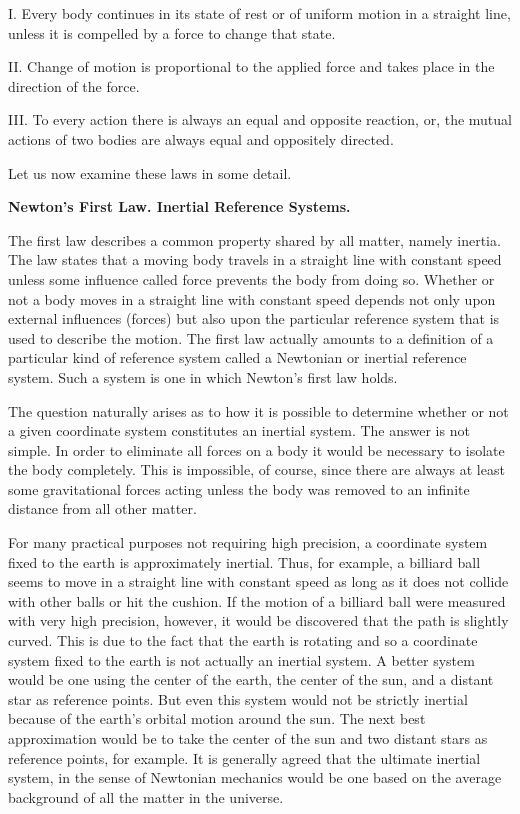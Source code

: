 \documentclass[a4paper]{article}
\begin{document}
I. Every body continues in its state of rest or of uniform motion in a straight line, unless it is compelled by a force to
change that state.

II. Change of motion is proportional to the applied force and takes place in the direction of the force.

III. To every action there is always an equal and opposite reaction, or, the mutual actions of two bodies are always equal
and oppositely directed.

Let us now examine these laws in some detail.

\textbf{Newton's First Law. Inertial Reference Systems.}

The first law describes a common property shared by all matter, namely inertia. The law states that a moving body travels
in a straight line with constant speed unless some influence called force prevents the body from doing so. Whether or not
a body moves in a straight line with constant speed depends not only upon external influences (forces) but also upon the
particular reference system that is used to describe the motion. The first law actually amounts to a definition of a
particular kind of reference system called a Newtonian or inertial reference system. Such a system is one in which Newton's
first law holds.

The question naturally arises as to how it is possible to determine whether or not a given coordinate system constitutes
an inertial system. The answer is not simple. In order to eliminate all forces on a body it would be necessary to isolate
the body completely. This is impossible, of course, since there are always at least some gravitational forces acting unless
the body was removed to an infinite distance from all other matter.

For many practical purposes not requiring high precision, a coordinate system fixed to the earth is approximately inertial.
Thus, for example, a billiard ball seems to move in a straight line with constant speed as long as it does not collide with
other balls or hit the cushion. If the motion of a billiard ball were measured with very high precision, however, it would be
discovered that the path is slightly curved. This is due to the fact that the earth is rotating and so a coordinate system
fixed to the earth is not actually an inertial system. A better system would be one using the center of the earth, the center
of the sun, and a distant star as reference points. But even this system would not be strictly inertial because of the
earth's orbital motion around the sun. The next best approximation would be to take the center of the sun and two distant
stars as reference points, for example. It is generally agreed that the ultimate inertial system, in the sense of Newtonian
mechanics would be one based on the average background of all the matter in the universe.
\end{document}
